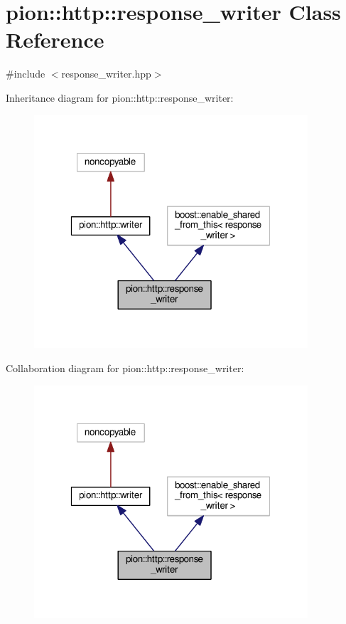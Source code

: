 \hypertarget{classpion_1_1http_1_1response__writer}{\section{pion\-:\-:http\-:\-:response\-\_\-writer Class Reference}
\label{classpion_1_1http_1_1response__writer}
}


{\ttfamily \#include $<$response\-\_\-writer.\-hpp$>$}



Inheritance diagram for pion\-:\-:http\-:\-:response\-\_\-writer\-:
\nopagebreak
\begin{figure}[H]
\begin{center}
\leavevmode
\includegraphics[width=289pt]{classpion_1_1http_1_1response__writer__inherit__graph}
\end{center}
\end{figure}


Collaboration diagram for pion\-:\-:http\-:\-:response\-\_\-writer\-:
\nopagebreak
\begin{figure}[H]
\begin{center}
\leavevmode
\includegraphics[width=289pt]{classpion_1_1http_1_1response__writer__coll__graph}
\end{center}
\end{figure}
